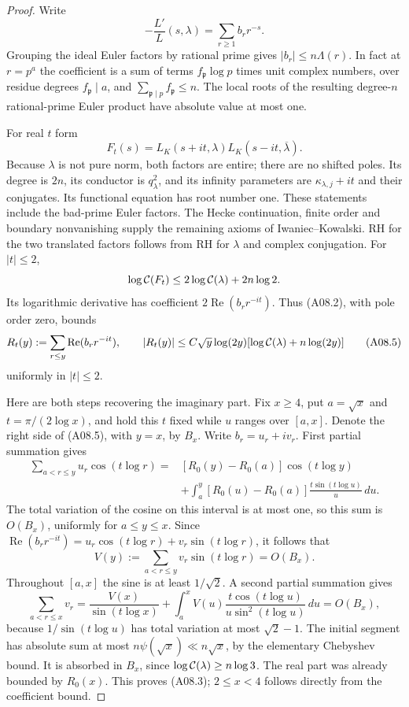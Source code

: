 \begin{proof}
Write
\[
 -\frac{L'}L(s,\lambda)=\sum_{r\ge1}b_r r^{-s}.
 \]
Grouping the ideal Euler factors by rational prime gives
\(|b_r|\le n\Lambda(r)\). In fact at \(r=p^a\) the coefficient
is a sum of terms \(f_{\mathfrak p}\log p\) times unit complex
numbers, over residue degrees \(f_{\mathfrak p}\mid a\), and
\(\sum_{\mathfrak p\mid p}f_{\mathfrak p}\le n\).
The local roots of the resulting degree-\(n\) rational-prime
Euler product have absolute value at most one.

For real \(t\) form
\[
 F_t(s)=L_K(s+it,\lambda)L_K(s-it,\overline\lambda).
 \]
Because \(\lambda\) is not pure norm, both factors are entire;
there are no shifted poles. Its degree is \(2n\), its conductor
is \(q_\lambda^2\), and its infinity parameters are
\(\kappa_{\lambda,j}+it\) and their conjugates. Its functional
equation has root number one. These statements include the
bad-prime Euler factors. The Hecke continuation, finite order
and boundary nonvanishing supply the remaining axioms of
Iwaniec--Kowalski. RH for the two translated factors follows
from RH for \(\lambda\) and complex conjugation.
For \(|t|\le2\),
\[
 \log{\cal C}(F_t)\le
           2\log{\cal C}(\lambda)+2n\log2 .
 \]
Its logarithmic derivative has coefficient
\(2\operatorname{Re}(b_r r^{-it})\).
Thus (A08.2), with pole order zero, bounds
\[
 R_t(y):=\sum_{r\le y}\operatorname{Re}(b_r r^{-it}),
 \qquad
 |R_t(y)|\le C\sqrt y\log(2y)
           [\log{\cal C}(\lambda)+n\log(2y)]              \tag{A08.5}
\]
uniformly in \(|t|\le2\).

Here are both steps recovering the imaginary part. Fix \(x\ge4\),
put \(a=\sqrt x\) and \(t=\pi/(2\log x)\), and hold this \(t\)
fixed while \(u\) ranges over \([a,x]\).
Denote the right side of (A08.5), with \(y=x\), by \(B_x\).
Write \(b_r=u_r+iv_r\). First partial summation gives
\[
 \begin{split}
 \sum_{a<r\le y}u_r\cos(t\log r)
  ={}&[R_0(y)-R_0(a)]\cos(t\log y)\\
    &+\int_a^y[R_0(u)-R_0(a)]
                       \frac{t\sin(t\log u)}u\,du .
 \end{split}
\]
The total variation of the cosine on this interval is at most
one, so this sum is \(O(B_x)\), uniformly for \(a\le y\le x\).
Since
\(\operatorname{Re}(b_r r^{-it})
   =u_r\cos(t\log r)+v_r\sin(t\log r)\),
it follows that
\[
 V(y):=\sum_{a<r\le y}v_r\sin(t\log r)=O(B_x).
 \]
Throughout \([a,x]\) the sine is at least \(1/\sqrt2\).
A second partial summation gives
\[
 \sum_{a<r\le x}v_r
   =\frac{V(x)}{\sin(t\log x)}
    +\int_a^x V(u)
                \frac{t\cos(t\log u)}
                     {u\sin^2(t\log u)}\,du
   =O(B_x),
 \]
because \(1/\sin(t\log u)\) has total variation at most
\(\sqrt2-1\). The initial segment has absolute sum at most
\(n\psi(\sqrt x)\ll n\sqrt x\), by the elementary Chebyshev
bound. It is absorbed in \(B_x\), since
\(\log{\cal C}(\lambda)\ge n\log3\).
The real part was already bounded by \(R_0(x)\).
This proves (A08.3); \(2\le x<4\) follows directly from the
coefficient bound.


\end{proof}
